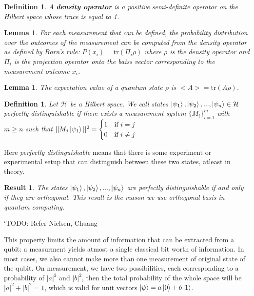 \documentclass[12pt,twoside]{report}
\theoremstyle{thmstyle}
\newtheorem{defn}[subsection]{Definition}
\newtheorem{lemma}[subsection]{Lemma}
\newtheorem{result}[subsection]{Result}
\begin{document}
\begin{defn}
    A \textbf{density operator} is a positive semi-definite operator on the Hilbert space whose trace is equal to 1.
\end{defn}

\begin{lemma}
    For each measurement that can be defined, the probability distribution over the outcomes of the measurement can be computed from the density operator as defined by Born's rule:
    $P(x_i) = \text{tr}(\Pi_i \rho)$ where $\rho$ is the density operator and $\Pi_i$ is the projection operator onto the baiss vector corresponding to the measurement outcome $x_i$.
\end{lemma}

\begin{lemma}
    The expectation value of a quantum state $\rho$ is $<A> = \text{tr}(A \rho)$.
\end{lemma}

\begin{defn}
    Let $\mathcal{H}$ be a Hilbert space. We call states $\ket{\psi_1}, \ket{\psi_2}, ..., \ket{\psi_n} \in \mathcal{H}$ perfectly distinguishable if there exists a measurement system $\{ M_i \}_{i=1}^m$ with $m \geq n$ such that $|| M_j \ket{\psi_1} ||^2 = \begin{cases} 1 & \text{if } i = j \\ 0 & \text{if } i \neq j \end{cases}$
\end{defn}
Here \textit{perfectly distinguishable} means that there is some experiment or experimental setup that can distinguish between these two states, atleast in theory.
\begin{result}
    The states $\ket{\psi_1}, \ket{\psi_2}, ..., \ket{\psi_n}$ are perfectly distinguishable if and only if they are orthogonal. This result is the reason we use orthogonal basis in quantum computing.
\end{result}
`TODO: Refer Nielsen, Chuang

This property limits the amount of information that can be extracted from a qubit: a measurment yields atmost a single classical bit worth of information. In most cases, we also cannot make more than one measurement of original state of the qubit. On measurement, we have two possibilities, each corresponding to a probability of $|a|^2$ and $|b|^2$, then the total probability of the whole space will be $|a|^2 + |b|^2 = 1$, which is valid for unit vectors $\ket{\psi} = a \ket{0} + b \ket{1}$.
\end{document}
